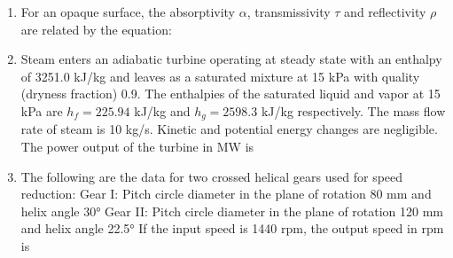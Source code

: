 \documentclass[journal,12pt,onecolumn]{IEEEtran}
\begin{document}
\begin{enumerate}
    \item For an opaque surface, the absorptivity \(\alpha\), transmissivity \(\tau\) and reflectivity \(\rho\) are related by the equation:

          \begin{enumerate}
          \end{enumerate}

    \item Steam enters an adiabatic turbine operating at steady state with an enthalpy of 3251.0 kJ/kg and leaves as a saturated mixture at 15 kPa with quality (dryness fraction) 0.9. The enthalpies of the saturated liquid and vapor at 15 kPa are \(h_f = 225.94\) kJ/kg and \(h_g = 2598.3\) kJ/kg respectively. The mass flow rate of steam is 10 kg/s. Kinetic and potential energy changes are negligible. The power output of the turbine in MW is

          \begin{enumerate}
          \end{enumerate}

    \item The following are the data for two crossed helical gears used for speed reduction:
          Gear I: Pitch circle diameter in the plane of rotation 80 mm and helix angle 30°
          Gear II: Pitch circle diameter in the plane of rotation 120 mm and helix angle 22.5°
          If the input speed is 1440 rpm, the output speed in rpm is

          \begin{enumerate}
          \end{enumerate}


\end{enumerate}
\end{document}
